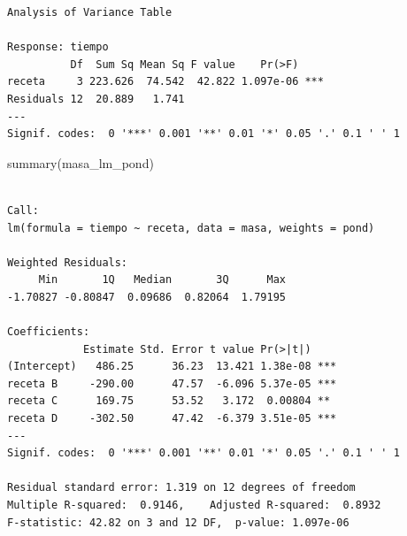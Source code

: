 \documentclass[
  letterpaper,
  DIV=11,
  numbers=noendperiod]{scrartcl}
\newenvironment{Shaded}{\begin{snugshade}}{\end{snugshade}}
\newcommand{\AttributeTok}[1]{\textcolor[rgb]{0.40,0.45,0.13}{#1}}
\newcommand{\CommentTok}[1]{\textcolor[rgb]{0.37,0.37,0.37}{#1}}
\newcommand{\DecValTok}[1]{\textcolor[rgb]{0.68,0.00,0.00}{#1}}
\newcommand{\FunctionTok}[1]{\textcolor[rgb]{0.28,0.35,0.67}{#1}}
\newcommand{\NormalTok}[1]{\textcolor[rgb]{0.00,0.23,0.31}{#1}}
\newcommand{\OtherTok}[1]{\textcolor[rgb]{0.00,0.23,0.31}{#1}}
\newcommand{\SpecialCharTok}[1]{\textcolor[rgb]{0.37,0.37,0.37}{#1}}
\begin{document}
\begin{Shaded}
\end{Shaded}

\begin{verbatim}
Analysis of Variance Table

Response: tiempo
          Df  Sum Sq Mean Sq F value    Pr(>F)    
receta     3 223.626  74.542  42.822 1.097e-06 ***
Residuals 12  20.889   1.741                      
---
Signif. codes:  0 '***' 0.001 '**' 0.01 '*' 0.05 '.' 0.1 ' ' 1
\end{verbatim}

\begin{Shaded}
\begin{Highlighting}[]
\FunctionTok{summary}\NormalTok{(masa\_lm\_pond)}
\end{Highlighting}
\end{Shaded}

\begin{verbatim}

Call:
lm(formula = tiempo ~ receta, data = masa, weights = pond)

Weighted Residuals:
     Min       1Q   Median       3Q      Max 
-1.70827 -0.80847  0.09686  0.82064  1.79195 

Coefficients:
            Estimate Std. Error t value Pr(>|t|)    
(Intercept)   486.25      36.23  13.421 1.38e-08 ***
receta B     -290.00      47.57  -6.096 5.37e-05 ***
receta C      169.75      53.52   3.172  0.00804 ** 
receta D     -302.50      47.42  -6.379 3.51e-05 ***
---
Signif. codes:  0 '***' 0.001 '**' 0.01 '*' 0.05 '.' 0.1 ' ' 1

Residual standard error: 1.319 on 12 degrees of freedom
Multiple R-squared:  0.9146,    Adjusted R-squared:  0.8932 
F-statistic: 42.82 on 3 and 12 DF,  p-value: 1.097e-06
\end{verbatim}
\end{document}
